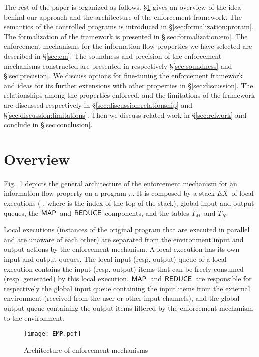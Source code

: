 \documentclass[10pt,a4paper,oneside]{article}
\def\TAV{\ensuremath{T_{M}}}
\def\TPV{\ensuremath{T_{R}}}
\def\ST{{\ensuremath{EX}}}
\def\sanserif#1{\ensuremath{\sf #1}}
\def\REDUCE{\ensuremath{\sanserif{REDUCE}}}
\def\MAP{\ensuremath{\sanserif{MAP}}}
\def\Prog{\ensuremath{\pi}}
\begin{document}
The rest of the paper is organized as follows. \S\ref{sec:overview} gives an overview of the idea behind our approach and the architecture of the enforcement framework. The semantics of the controlled programs is introduced in \S\ref{sec:formalization:proram}. The formalization of the framework is presented in \S\ref{sec:formalization:em}. The enforcement mechanisms for the information flow properties we have selected are described in \S\ref{sec:em}. The soundness and precision of the enforcement mechanisms constructed are presented in respectively \S\ref{sec:soundness} and \S\ref{sec:precision}. We discuss options for fine-tuning the enforcement framework and ideas for its further extensions with other properties  in \S\ref{sec:discussion}. The relationships among the properties enforced, and the limitations of the framework are discussed respectively in \S\ref{sec:discussion:relationship} and \S\ref{sec:discussion:limitations}. Then we discuss related work in \S\ref{sec:relwork} and conclude in \S\ref{sec:conclusion}.


\section{Overview}\label{sec:overview}
Fig.~\ref{fig:archiectureEMP} depicts the general architecture of the enforcement mechanism for an information flow property on a program \Prog. It is composed by a stack \ST\ of local executions ( , where  is the index of the top of the stack), global input and output queues, the \MAP\ and \REDUCE\ components, and the tables \TAV\ and \TPV.


Local executions (instances of the original program that are executed in parallel and are unaware of each other) are separated from the environment input and output actions by the enforcement mechanism. A local execution has its own input and output queues. The local input (resp. output) queue of a local execution contains the input (resp. output) items that can be freely consumed (resp. generated) by this local execution. \MAP\ and \REDUCE\ are responsible for respectively the global input queue containing the input items from the external environment (received from the user or other input channels), and the global output queue containing the output items filtered by the enforcement mechanism to the environment.


\begin{figure}
\centering
\texttt{[image: EMP.pdf]}
\caption{Architecture of enforcement mechanisms}
\label{fig:archiectureEMP}
\end{figure}
\end{document}

